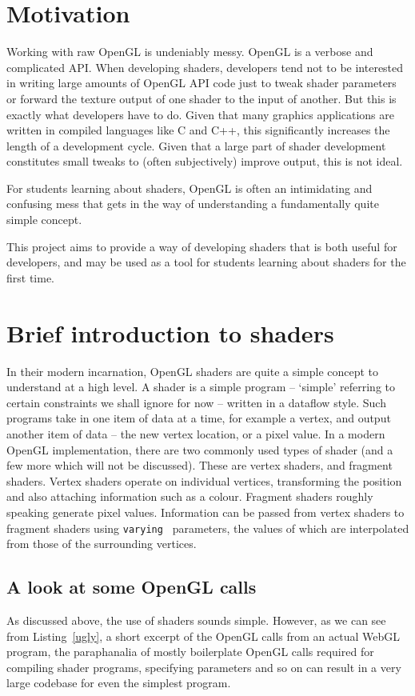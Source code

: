\documentclass[12pt,twoside,notitlepage]{report}
\begin{document}
\section{Motivation}
Working with raw OpenGL is undeniably messy. OpenGL is a verbose and complicated API. When developing shaders, developers tend not to be interested in writing large amounts of OpenGL API code just to tweak shader parameters or forward the texture output of one shader to the input of another. But this is exactly what developers have to do. Given that many graphics applications are written in compiled languages like C and C++, this significantly increases the length of a development cycle. Given that a large part of shader development constitutes small tweaks to (often subjectively) improve output, this is not ideal.

For students learning about shaders, OpenGL is often an intimidating and confusing mess that gets in the way of understanding a fundamentally quite simple concept.

This project aims to provide a way of developing shaders that is both useful for developers, and may be used as a tool for students learning about shaders for the first time.
\section{Brief introduction to shaders}
\label{brief}
In their modern incarnation, OpenGL shaders are quite a simple concept to understand at a high level. A shader is a simple program -- `simple' referring to certain constraints we shall ignore for now -- written in a dataflow style. Such programs take in one item of data at a time, for example a vertex, and output another item of data -- the new vertex location, or a pixel value.
In a modern OpenGL implementation, there are two commonly used types of shader (and a few more which will not be discussed). These are vertex shaders, and fragment shaders. Vertex shaders operate on individual vertices, transforming the position and also attaching information such as a colour. Fragment shaders roughly speaking generate pixel values. Information can be passed from vertex shaders to fragment shaders using {\tt varying } parameters, the values of which are interpolated from those of the surrounding vertices.

\subsection{A look at some OpenGL calls}
As discussed above, the use of shaders sounds simple. However, as we can see from Listing~\ref{ugly}, a short excerpt of the OpenGL calls from an actual WebGL program\cite{reaction-diffusion}, the paraphanalia of mostly boilerplate OpenGL calls required for compiling shader programs, specifying parameters and so on can result in a very large codebase for even the simplest program.
\end{document}
